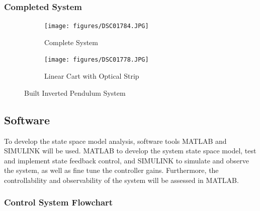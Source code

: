 \documentclass[12pt]{article}
\begin{document}
\subsubsection{Completed System}
\begin{figure}[H]
    \centering
    \begin{subfigure}{.49\textwidth}
      \centering
      \texttt{[image: figures/DSC01784.JPG]}
      \caption{Complete System}
      \label{fig:comp}
    \end{subfigure}%
    \begin{subfigure}{.49\textwidth}
      \centering
      \texttt{[image: figures/DSC01778.JPG]}
      \caption{Linear Cart with Optical Strip}
      \label{fig:compstrip}
    \end{subfigure}
    \caption{Built Inverted Pendulum System}
    \label{fig:invDone}
\end{figure}



\subsection{Software}
To develop the state space model analysis, software tools MATLAB and SIMULINK will be used. MATLAB to develop the system state space model, test and implement state feedback control, and SIMULINK to simulate and observe the system, as well as fine tune the controller gains. Furthermore, the controllability and observability of the system will be assessed in MATLAB.

\subsubsection{Control System Flowchart}
\end{document}

